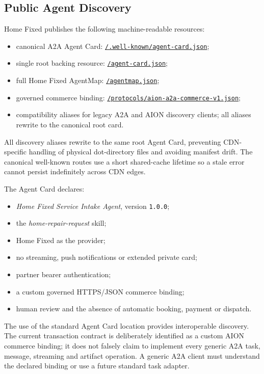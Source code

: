 \subsection{Public Agent Discovery}

Home Fixed publishes the following machine-readable resources:

\begin{itemize}
  \item canonical A2A Agent Card: \href{https://www.homefixed.com/.well-known/agent-card.json}{\texttt{/.well-known/agent-card.json}};
  \item single root backing resource: \href{https://www.homefixed.com/agent-card.json}{\texttt{/agent-card.json}};
  \item full Home Fixed AgentMap: \href{https://www.homefixed.com/agentmap.json}{\texttt{/agentmap.json}};
  \item governed commerce binding: \href{https://www.homefixed.com/protocols/aion-a2a-commerce-v1.json}{\texttt{/protocols/aion-a2a-commerce-v1.json}};
  \item compatibility aliases for legacy A2A and AION discovery clients; all aliases rewrite to the canonical root card.
\end{itemize}

All discovery aliases rewrite to the same root Agent Card, preventing CDN-specific handling of physical dot-directory files and avoiding manifest drift.  The canonical well-known routes use a short shared-cache lifetime so a stale error cannot persist indefinitely across CDN edges.

The Agent Card declares:

\begin{itemize}
  \item \emph{Home Fixed Service Intake Agent}, version \texttt{1.0.0};
  \item the \emph{home-repair-request} skill;
  \item Home Fixed as the provider;
  \item no streaming, push notifications or extended private card;
  \item partner bearer authentication;
  \item a custom governed HTTPS/JSON commerce binding;
  \item human review and the absence of automatic booking, payment or dispatch.
\end{itemize}

The use of the standard Agent Card location provides interoperable discovery.  The current transaction contract is deliberately identified as a custom AION commerce binding; it does not falsely claim to implement every generic A2A task, message, streaming and artifact operation.  A generic A2A client must understand the declared binding or use a future standard task adapter.


